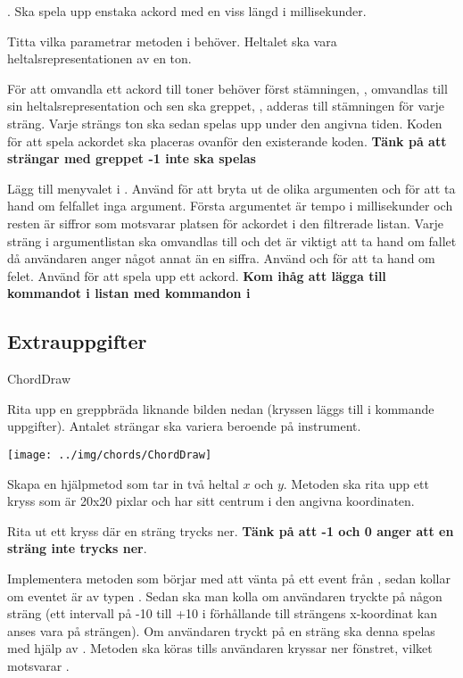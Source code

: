 {\Task {}. Ska spela upp enstaka ackord  med en viss längd  i millisekunder.

\Subtask Titta vilka parametrar metoden  i  behöver. Heltalet  ska vara heltalsrepresentationen av en ton.

\Subtask För att omvandla ett ackord till toner behöver först stämningen, , omvandlas till sin heltalsrepresentation och sen ska greppet, , adderas till stämningen för varje sträng. Varje strängs ton ska sedan spelas upp under den angivna tiden. Koden för att spela ackordet ska placeras ovanför den existerande koden. \textbf{Tänk på att strängar med greppet -1 inte ska spelas}

\Subtask Lägg till menyvalet  i . Använd  för att bryta ut de olika argumenten och för att ta hand om felfallet inga argument. Första argumentet är tempo i millisekunder och resten är siffror som motsvarar platsen för ackordet i den filtrerade listan. Varje sträng i argumentlistan ska omvandlas till  och det är viktigt att ta hand om fallet då användaren anger något annat än en siffra. Använd  och  för att ta hand om felet. Använd  för att spela upp ett ackord. \textbf{Kom ihåg att lägga till kommandot i listan med kommandon i }

\subsection{Extrauppgifter}

\Task ChordDraw

\Subtask Rita upp en greppbräda liknande bilden nedan (kryssen läggs till i kommande uppgifter). Antalet strängar ska variera beroende på instrument.

\texttt{[image: ../img/chords/ChordDraw]}

\Subtask Skapa en hjälpmetod  som tar in två heltal $x$ och $y$. Metoden ska rita upp ett kryss som är 20x20 pixlar och har sitt centrum i den angivna koordinaten.

\Subtask Rita ut ett kryss där en sträng trycks ner. \textbf{Tänk på att -1 och 0 anger att en sträng inte trycks ner}.

\Subtask Implementera metoden  som börjar med att vänta på ett event från , sedan kollar om eventet är av typen . Sedan ska man kolla om användaren tryckte på någon sträng (ett intervall på -10 till +10 i förhållande till strängens x-koordinat kan anses vara på strängen). Om användaren tryckt på en sträng ska denna spelas med hjälp av . Metoden  ska köras tills användaren kryssar ner fönstret, vilket motsvarar .

}
